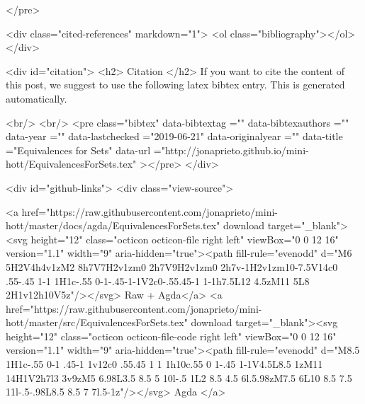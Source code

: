 </pre>


  <div class="cited-references" markdown="1">
  <ol class="bibliography"></ol>
  </div>


  
  <div id="citation">
  <h2> Citation </h2>
  If you want to cite the content of this post,
  we suggest to use the following latex bibtex entry.
  This is generated automatically.

  <br/>
  <br/>
  <pre class="bibtex"
       data-bibtextag =""
       data-bibtexauthors =""
       data-year =""
       data-lastchecked ="2019-06-21"
       data-originalyear =""
       data-title ="Equivalences for Sets"
       data-url ="http://jonaprieto.github.io/mini-hott/EquivalencesForSets.tex"
  ></pre>
  </div>
  

  <div id="github-links">
    <div class="view-source">
      
        <a href="https://raw.githubusercontent.com/jonaprieto/mini-hott/master/docs/agda/EquivalencesForSets.tex" download target="_blank"><svg height="12" class="octicon octicon-file right left" viewBox="0 0 12 16" version="1.1" width="9" aria-hidden="true"><path fill-rule="evenodd" d="M6 5H2V4h4v1zM2 8h7V7H2v1zm0 2h7V9H2v1zm0 2h7v-1H2v1zm10-7.5V14c0 .55-.45 1-1 1H1c-.55 0-1-.45-1-1V2c0-.55.45-1 1-1h7.5L12 4.5zM11 5L8 2H1v12h10V5z"/></svg> Raw + Agda</a>
        <a href="https://raw.githubusercontent.com/jonaprieto/mini-hott/master/src/EquivalencesForSets.tex" download target="_blank"><svg height="12" class="octicon octicon-file-code right left" viewBox="0 0 12 16" version="1.1" width="9" aria-hidden="true"><path fill-rule="evenodd" d="M8.5 1H1c-.55 0-1 .45-1 1v12c0 .55.45 1 1 1h10c.55 0 1-.45 1-1V4.5L8.5 1zM11 14H1V2h7l3 3v9zM5 6.98L3.5 8.5 5 10l-.5 1L2 8.5 4.5 6l.5.98zM7.5 6L10 8.5 7.5 11l-.5-.98L8.5 8.5 7 7l.5-1z"/></svg> Agda </a>
      
